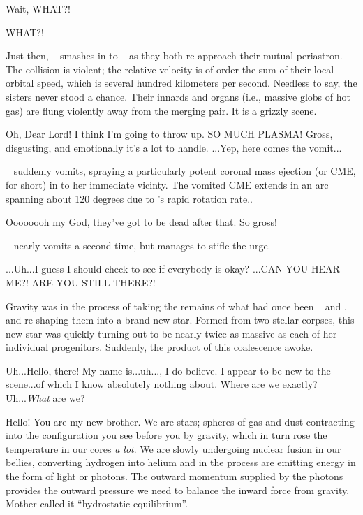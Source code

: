 \documentclass[main.tex]{subfiles}
\begin{document}
\newpara \Taygete  Wait, WHAT?!

\newpara \Alcyone  WHAT?!

\newpara \nar Just then, \rmtaygete~ smashes in to \rmalcyone~ as they both re-approach their mutual periastron.  The collision is violent; the relative velocity is of order the sum of their local orbital speed, which is several hundred kilometers per second.  Needless to say, the sisters never stood a chance.  Their innards and organs (i.e., massive globs of hot gas) are flung violently away from the merging pair.  It is a grizzly scene.

\newpara \Celaeno Oh, Dear Lord!  I think I'm going to throw up.  SO MUCH PLASMA!  Gross, disgusting, and emotionally it's a lot to handle. ...Yep, here comes the vomit...

\newpara \nar \rmcelaeno~ suddenly vomits, spraying a particularly potent coronal mass ejection (or CME, for short) in to her immediate vicinty.  The vomited CME extends in an arc spanning about 120 degrees due to \rmcelaeno's rapid rotation rate..

\newpara \Celaeno Oooooooh my God, they've got to be dead after that.  So gross!  

\newpara \nar \rmcelaeno~ nearly vomits a second time, but manages to stifle the urge.

\newpara \Celaeno ...Uh...I guess I should check to see if everybody is okay? ...CAN YOU HEAR ME?!  ARE YOU STILL THERE?! 

\newpara \nar Gravity was in the process of taking the remains of what had once been \rmtaygete~ and \rmalcyone, and re-shaping them into a brand new star.  Formed from two stellar corpses, this new star was quickly turning out to be nearly twice as massive as each of her individual progenitors.  Suddenly, the product of this coalescence awoke.


\newpara \Lacedaemon Uh...Hello, there!  My name is...uh...\rmlacedaemon, I do believe.  I appear to be new to the scene...of which I know absolutely nothing about.  Where are we exactly?  Uh...\textit{What} are we?

\newpara \Celaeno Hello!  You are my new brother.  We are stars; spheres of gas and dust contracting into the configuration you see before you by gravity, which in turn rose the temperature in our cores \textit{a lot}.  We are slowly undergoing nuclear fusion in our bellies, converting hydrogen into helium and in the process are emitting energy in the form of light or photons.  The outward momentum supplied by the photons provides the outward pressure we need to balance the inward force from gravity.  Mother called it ``hydrostatic equilibrium''.
\end{document}
